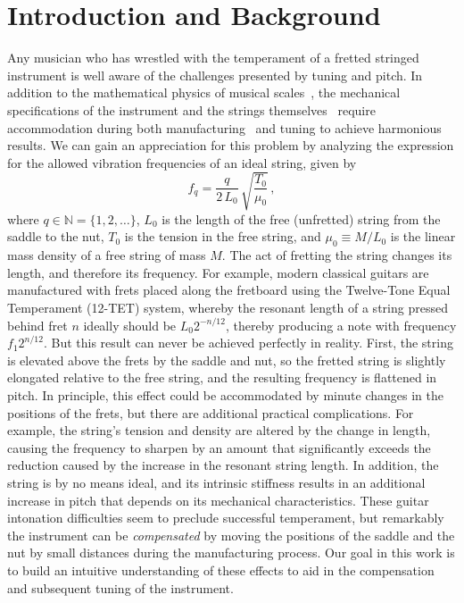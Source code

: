 %
%
%

 \section{Introduction and Background\label{sct:intro}}

Any musician who has wrestled with the temperament of a fretted stringed instrument is well aware of the challenges presented by tuning and pitch. In addition to the mathematical physics of musical scales~\cite{ref:durfee2015pms}, the mechanical specifications of the instrument and the strings themselves~\cite{ref:morse1981vas,ref:fletcher2005pmi} require accommodation during both manufacturing~\cite{ref:byers1996cgi,ref:varieschi2010icf} and tuning to achieve harmonious results. We can gain an appreciation for this problem by analyzing the expression for the allowed vibration frequencies of an ideal string, given by~\cite{ref:morse1981vsa,ref:fletcher2005pma}
 \begin{equation} \label{eqn:f_0_def}
f_q = \frac{q}{2\, L_0}\, \sqrt{\frac{T_0}{\mu_0}}\, ,
 \end{equation}
where $q \in \mathbb{N} = \{1, 2, \dots\}$, $L_0$ is the length of the free (unfretted) string from the saddle to the nut, $T_0$ is the tension in the free string, and $\mu_0 \equiv M / L_0$ is the linear mass density of a free string of mass $M$. The act of fretting the string changes its length, and therefore its frequency. For example, modern classical guitars are manufactured with frets placed along the fretboard using the Twelve-Tone Equal Temperament (12-TET) system, whereby the resonant length of a string pressed behind fret $n$ ideally should be $L_0 2^{-n/12}$, thereby producing a note with frequency $f_1 2^{n/12}$. But this result can never be achieved perfectly in reality. First, the string is elevated above the frets by the saddle and nut, so the fretted string is slightly elongated relative to the free string, and the resulting frequency is flattened in pitch. In principle, this effect could be accommodated by minute changes in the positions of the frets, but there are additional practical complications. For example, the string's tension and density are altered by the change in length, causing the frequency to sharpen by an amount that significantly exceeds the reduction caused by the increase in the resonant string length. In addition, the string is by no means ideal, and its intrinsic stiffness results in an additional increase in pitch that depends on its mechanical characteristics. These guitar intonation difficulties seem to preclude successful temperament, but remarkably the instrument can be \emph{compensated} by moving the positions of the saddle and the nut by small distances during the manufacturing process. Our goal in this work is to build an intuitive understanding of these effects to aid in the compensation and subsequent tuning of the instrument. 

